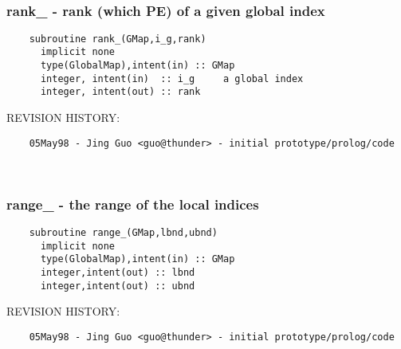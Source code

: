  
\mbox{}\hrulefill\ 
 

 \subsubsection{rank\_ - rank (which PE) of a given global index}


 
 
\begin{verbatim} 
    subroutine rank_(GMap,i_g,rank)
      implicit none
      type(GlobalMap),intent(in) :: GMap
      integer, intent(in)  :: i_g	  a global index
      integer, intent(out) :: rank
 \end{verbatim}{\sf REVISION HISTORY:}
\begin{verbatim}  	05May98 - Jing Guo <guo@thunder> - initial prototype/prolog/code\end{verbatim}
 
 
\mbox{}\hrulefill\ 
 

 \subsubsection{range\_ - the range of the local indices}


 
 
\begin{verbatim} 
    subroutine range_(GMap,lbnd,ubnd)
      implicit none
      type(GlobalMap),intent(in) :: GMap
      integer,intent(out) :: lbnd
      integer,intent(out) :: ubnd
 \end{verbatim}{\sf REVISION HISTORY:}
\begin{verbatim}  	05May98 - Jing Guo <guo@thunder> - initial prototype/prolog/code\end{verbatim}


